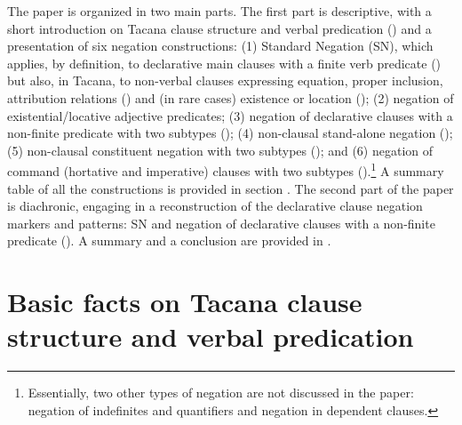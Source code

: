 \documentclass[output=paper,draft,draftmode,colorlinks,citecolor=brown]{langscibook}
\begin{document}
The paper is organized in two main parts. The first part is descriptive,
with a short introduction on Tacana clause structure and verbal predication
() and a presentation of six negation constructions:
(1) Standard Negation (SN), which applies, by definition, to
declarative main clauses with a finite verb predicate
\parencite{Miestamo2005}
() but also, in Tacana, to non-verbal clauses
expressing equation, proper inclusion,
attribution relations () and (in rare cases)
existence or location (); 
(2) negation of existential\slash loca\-ti\-ve adjective
predicates;
(3) negation of declarative clauses with a non-finite
predicate with two subtypes ();
(4) non-clausal stand-alone negation
(); 
(5) non-clausal constituent negation with two subtypes (); and
(6) negation of command (hortative and imperative) clauses with
two subtypes ().\footnote{Essentially, two other
types of negation are not discussed in the paper: negation of indefinites
and quantifiers and negation in dependent clauses.} A summary table of all the constructions is provided in section
. The second part
of the paper is diachronic, engaging in a reconstruction of the
declarative clause negation markers and patterns: SN and negation of
declarative clauses with a non-finite predicate ().
A summary and a conclusion are provided in .

\section{Basic facts on Tacana clause structure and verbal predication}%
\label{sec:tacana-2}
\end{document}
